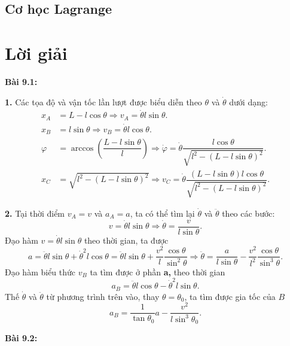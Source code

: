\subsection*{Cơ học Lagrange}


\section{Lời giải}

\textbf{Bài 9.1:} 

\textbf{1.} Các tọa độ và vận tốc lần lượt được biểu diễn theo $\theta$ và $\dot{\theta}$ dưới dạng:
\begin{align*}
    x_A &= L - l \cos \theta \Rightarrow v_A= \dot{\theta} l \sin \theta. \\
    x_B &= l \sin \theta \Rightarrow v_B = \dot{\theta} l \cos \theta. \\
    \varphi &= \arccos \left( \dfrac{L - l \sin \theta}{l} \right) \Rightarrow \dot{\varphi} = \dot{\theta} \dfrac{l \cos \theta}{\sqrt{l^2 - \left( L - l \sin \theta \right)^2}}. \\
    x_C &= \sqrt{l^2 - \left( L - l \sin \theta \right)^2} \Rightarrow v_C = \dot{\theta} \dfrac{(L-l \sin \theta) l \cos \theta}{\sqrt{l^2 - \left( L - l \sin \theta \right)^2}}.
\end{align*}

\textbf{2.} Tại thời điểm \(v_A=v\) và \(a_A=a\), ta có thể tìm lại \(\dot{\theta}\) và \(\ddot{\theta}\) theo các bước:
\begin{equation} \label{eq1_rectangle_collision}
    v=\dot{\theta} l \sin \theta \Rightarrow \dot{\theta}= \dfrac{v}{l \sin \theta}.
\end{equation}
Đạo hàm $v=\dot{\theta} l \sin \theta$ theo thời gian, ta được
\begin{equation} \label{eq2_rectangle_collision}
    a = \ddot{\theta} l \sin \theta + \dot{\theta}^2 l \cos \theta = \ddot{\theta} l \sin \theta + \dfrac{v^2}{l} \dfrac{\cos \theta}{\sin^2 \theta} \Rightarrow \ddot{\theta}= \dfrac{a}{l \sin \theta} - \dfrac{v^2}{l^2} \dfrac{\cos \theta}{\sin^3 \theta}.
\end{equation}
Đạo hàm biểu thức $v_B$ ta tìm được ở phần \textbf{a,} theo thời gian
\begin{equation} \label{eq3_rectangle_collision}
    a_B = \ddot{\theta} l \cos \theta - \dot{\theta}^2 l \sin \theta.
\end{equation}
Thế $\dot{\theta}$ và $\ddot{\theta}$ từ phương trình trên vào, thay $\theta=\theta_0$, ta tìm được gia tốc của $B$
\begin{equation} \label{eq4_rectangle_collision}
    a_B = \dfrac{1}{\tan \theta_0} a - \dfrac{v^2}{l \sin^3 \theta_0}.
\end{equation}


\textbf{Bài 9.2:}

